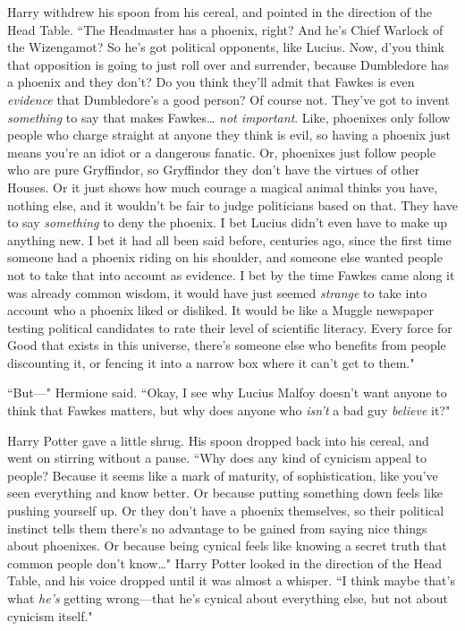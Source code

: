 Harry withdrew his spoon from his cereal, and pointed in the direction of the Head Table. ``The Headmaster has a phoenix, right? And he's Chief Warlock of the Wizengamot? So he's got political opponents, like Lucius. Now, d'you think that opposition is going to just roll over and surrender, because Dumbledore has a phoenix and they don't? Do you think they'll admit that Fawkes is even \emph{evidence} that Dumbledore's a good person? Of course not. They've got to invent \emph{something} to say that makes Fawkes{\ldots} \emph{not important}. Like, phoenixes only follow people who charge straight at anyone they think is evil, so having a phoenix just means you're an idiot or a dangerous fanatic. Or, phoenixes just follow people who are pure Gryffindor, so Gryffindor they don't have the virtues of other Houses. Or it just shows how much courage a magical animal thinks you have, nothing else, and it wouldn't be fair to judge politicians based on that. They have to say \emph{something} to deny the phoenix. I bet Lucius didn't even have to make up anything new. I bet it had all been said before, centuries ago, since the first time someone had a phoenix riding on his shoulder, and someone else wanted people not to take that into account as evidence. I bet by the time Fawkes came along it was already common wisdom, it would have just seemed \emph{strange} to take into account who a phoenix liked or disliked. It would be like a Muggle newspaper testing political candidates to rate their level of scientific literacy. Every force for Good that exists in this universe, there's someone else who benefits from people discounting it, or fencing it into a narrow box where it can't get to them."

``But---" Hermione said. ``Okay, I see why Lucius Malfoy doesn't want anyone to think that Fawkes matters, but why does anyone who \emph{isn't} a bad guy \emph{believe} it?"

Harry Potter gave a little shrug. His spoon dropped back into his cereal, and went on stirring without a pause. ``Why does any kind of cynicism appeal to people? Because it seems like a mark of maturity, of sophistication, like you've seen everything and know better. Or because putting something down feels like pushing yourself up. Or they don't have a phoenix themselves, so their political instinct tells them there's no advantage to be gained from saying nice things about phoenixes. Or because being cynical feels like knowing a secret truth that common people don't know{\ldots}" Harry Potter looked in the direction of the Head Table, and his voice dropped until it was almost a whisper. ``I think maybe that's what \emph{he's} getting wrong---that he's cynical about everything else, but not about cynicism itself."

